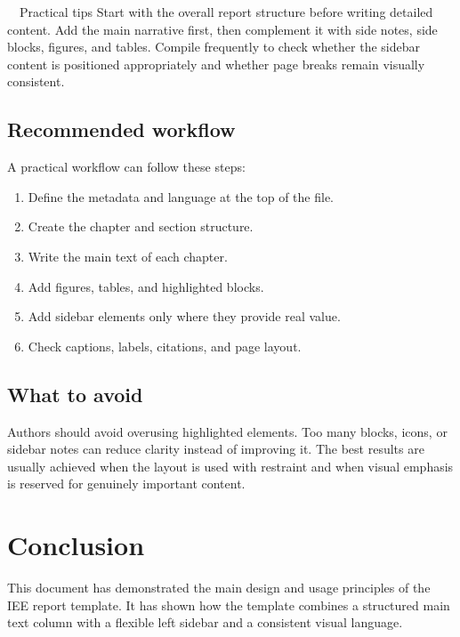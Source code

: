 \documentclass[11pt,a4paper]{report}
\begin{document}
\begin{coloredBlock}[turquoise]{~~Practical tips}
Start with the overall report structure before writing detailed content. Add the main narrative first, then complement it with side notes, side blocks, figures, and tables. Compile frequently to check whether the sidebar content is positioned appropriately and whether page breaks remain visually consistent.
\end{coloredBlock}

\section{Recommended workflow}

A practical workflow can follow these steps:
\begin{enumerate}
    \item Define the metadata and language at the top of the file.
    \item Create the chapter and section structure.
    \item Write the main text of each chapter.
    \item Add figures, tables, and highlighted blocks.
    \item Add sidebar elements only where they provide real value.
    \item Check captions, labels, citations, and page layout.
\end{enumerate}

\section{What to avoid}

Authors should avoid overusing highlighted elements. Too many blocks, icons, or sidebar notes can reduce clarity instead of improving it. The best results are usually achieved when the layout is used with restraint and when visual emphasis is reserved for genuinely important content.

\clearpage


\chapter{Conclusion}

This document has demonstrated the main design and usage principles of the IEE report template. It has shown how the template combines a structured main text column with a flexible left sidebar and a consistent visual language.
\end{document}
